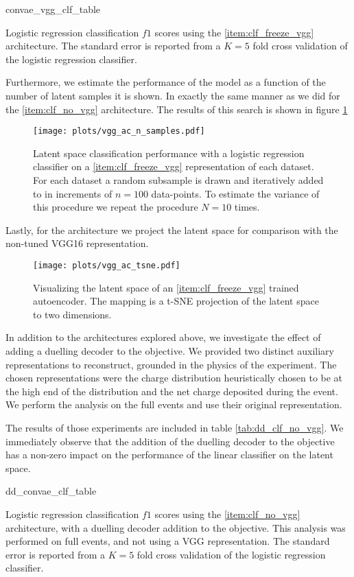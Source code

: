 \begin{table}
\centering
{convae_vgg_clf_table}
\caption{Logistic regression classification $f1$ scores using the \ref{item:clf_freeze_vgg} architecture. The standard error is reported from a $K=5$ fold cross validation of the logistic regression classifier.}\label{tab:clf_freeze_vgg}
\end{table}

\noindent Furthermore, we estimate the performance of the model as a function of the number of latent samples it is shown. In exactly the same manner as we did for the \ref{item:clf_no_vgg} architecture. The results of this search is shown in figure \ref{fig:vgg_ac_n_labelled}

\begin{figure}
\centering
\texttt{[image: plots/vgg\_ac\_n\_samples.pdf]}
\caption[Autoencoder performance on labelled subsets]{Latent space classification performance with a logistic regression classifier on a \ref{item:clf_freeze_vgg} representation of each dataset. For each dataset a random subsample is drawn and iteratively added to in increments of $n=100$ data-points. To estimate the variance of this procedure we repeat the procedure $N=10$ times.}\label{fig:vgg_ac_n_labelled}
\end{figure}

Lastly, for the architecture we project the latent space for comparison with the non-tuned VGG16 representation. 

\begin{figure}
\centering
\texttt{[image: plots/vgg\_ac\_tsne.pdf]}
\caption[VGG16-autoencoder latent space visualization]{Visualizing the latent space of an \ref{item:clf_freeze_vgg} trained autoencoder. The mapping is a t-SNE projection of the latent space to two dimensions.}\label{fig:vgg_ac_tnse}
\end{figure}

\noindent In addition to the architectures explored above, we investigate the effect of adding a duelling decoder to the objective. We provided two distinct auxiliary representations to reconstruct, grounded in the physics of the experiment. The chosen representations were the charge distribution heuristically chosen to be at the high end of the distribution and the net charge deposited during the event. We perform the analysis on the full events and use their original representation. 

The results of those experiments are included in table \ref{tab:dd_clf_no_vgg}. We immediately observe that the addition of the duelling decoder to the objective has a non-zero impact on the performance of the linear classifier on the latent space.

\begin{table}
\centering
{dd_convae_clf_table}
\caption{Logistic regression classification $f1$ scores using the \ref{item:clf_no_vgg} architecture, with a duelling decoder addition to the objective. This analysis was performed on full events, and not using a VGG representation. The standard error is reported from a $K=5$ fold cross validation of the logistic regression classifier.}\label{tab:dd_clf_no_vgg}
\end{table}